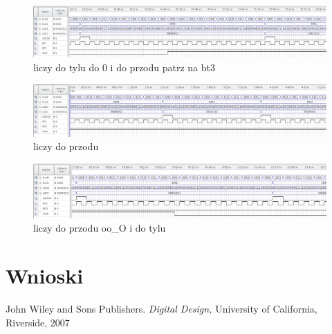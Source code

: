 \documentclass{classrep}
\begin{document}
\lipsum[6]

\begin{figure}[H]
	\centering
	\includegraphics[width=1.0\linewidth]{up_down_2}
	\caption{liczy do tylu do 0 i do przodu patrz na bt3}
	\label{fig:symhex0}
\end{figure}

\lipsum[7]

\begin{figure}[H]
	\centering
	\includegraphics[width=1.0\linewidth]{up_down_inv_1}
	\caption{liczy do przodu }
	\label{fig:symhex0}
\end{figure}

\lipsum[7]

\begin{figure}[H]
	\centering
	\includegraphics[width=1.0\linewidth]{up_down_inv_2}
	\caption{liczy do przodu  oo\_O i do tylu}
	\label{fig:symhex0}
\end{figure}

\section{Wnioski}

\lipsum[8]

\begin{thebibliography}{0}
   John Wiley and Sons Publishers.
    \textsl{Digital Design,} University of California, Riverside, 2007
\end{thebibliography}
\end{document}
